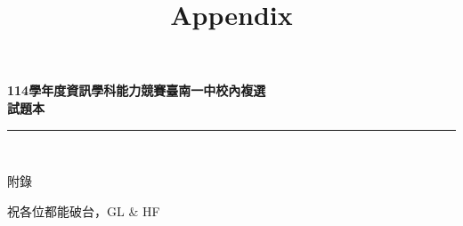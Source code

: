 \documentclass[a4paper]{article}
\title{Appendix}
\begin{document}
\begin{center}
\textbf{\huge 114學年度資訊學科能力競賽臺南一中校內複選}\\
\vspace{5mm}
\textbf{\huge 試題本}\\
\vspace{10mm}
\rule{17cm}{2pt}\\
\vspace{5mm}

\huge 附錄\\
\end{center}

\fontsize{14pt}{20pt}\selectfont

\noindent 祝各位都能破台，GL \& HF
\end{document}
